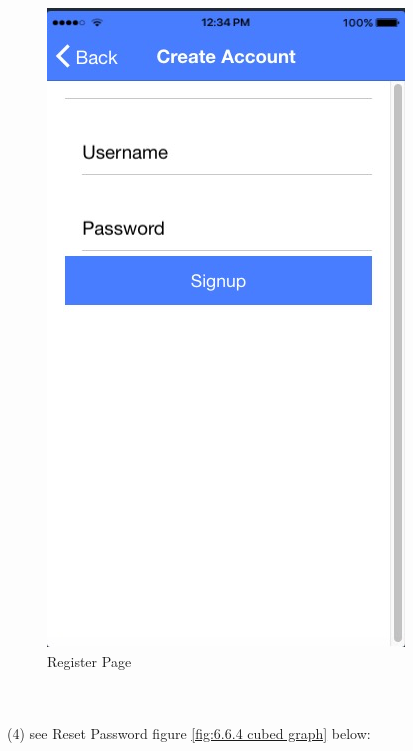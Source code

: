 \begin{figure}[h]
	\centering
	\includegraphics[scale=0.5]{img/Register.png}
	\caption{Register Page}
	\label{fig:6.6.3 cubed graph}
\end{figure}
\\ \\ (4) see Reset Password figure \ref{fig:6.6.4 cubed graph} below:
